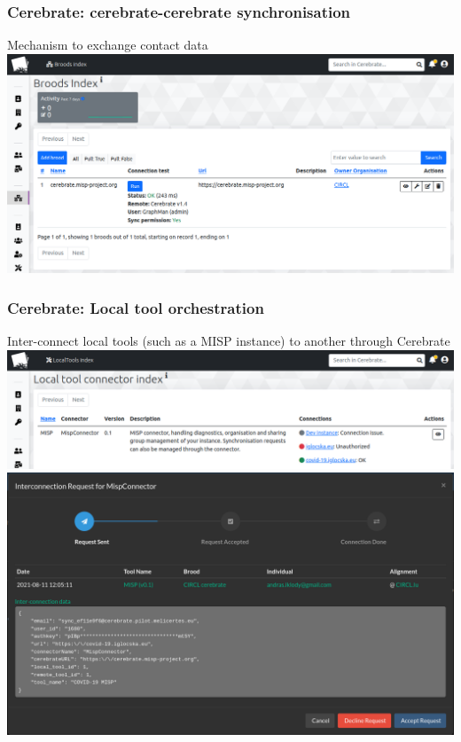 \begin{frame}
    \frametitle{Cerebrate: cerebrate-cerebrate synchronisation}
    Mechanism to exchange contact data
    \includegraphics[width=1.0\linewidth]{pictures/cerebrate-brood.png}
\end{frame}

\begin{frame}
    \frametitle{Cerebrate: Local tool orchestration}
    Inter-connect local tools (such as a MISP instance) to another through Cerebrate
    \includegraphics[width=1.0\linewidth]{pictures/cerebrate-lt.png}
    \includegraphics[width=1.0\linewidth]{pictures/cerebrate-inbox.png}
\end{frame}


